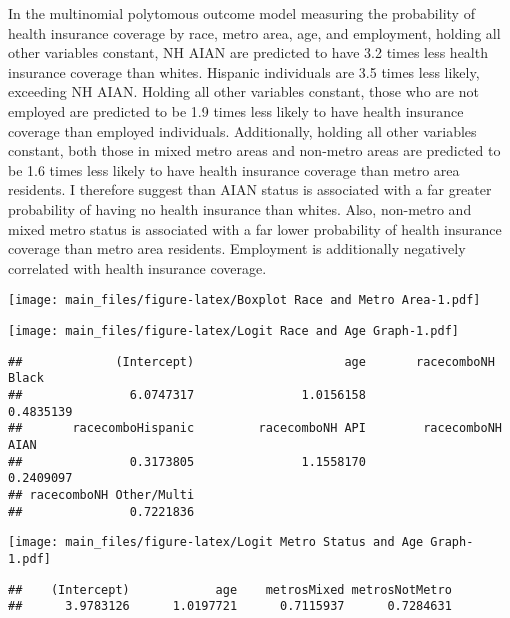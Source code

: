 \documentclass[11pt,]{article}
\makeatletter
\def\maxwidth{\ifdim\Gin@nat@width>\linewidth\linewidth
\else\Gin@nat@width\fi}
\let\Oldincludegraphics\includegraphics
\renewcommand{\includegraphics}[1]{\Oldincludegraphics[width=\maxwidth]{#1}}
\makeatother
\begin{document}
In the multinomial polytomous outcome model measuring the probability of
health insurance coverage by race, metro area, age, and employment,
holding all other variables constant, NH AIAN are predicted to have 3.2
times less health insurance coverage than whites. Hispanic individuals
are 3.5 times less likely, exceeding NH AIAN. Holding all other
variables constant, those who are not employed are predicted to be 1.9
times less likely to have health insurance coverage than employed
individuals. Additionally, holding all other variables constant, both
those in mixed metro areas and non-metro areas are predicted to be 1.6
times less likely to have health insurance coverage than metro area
residents. I therefore suggest than AIAN status is associated with a far
greater probability of having no health insurance than whites. Also,
non-metro and mixed metro status is associated with a far lower
probability of health insurance coverage than metro area residents.
Employment is additionally negatively correlated with health insurance
coverage.

\texttt{[image: main\_files/figure-latex/Boxplot Race and Metro Area-1.pdf]}

\texttt{[image: main\_files/figure-latex/Logit Race and Age Graph-1.pdf]}

\begin{verbatim}
##             (Intercept)                     age       racecomboNH Black 
##               6.0747317               1.0156158               0.4835139 
##       racecomboHispanic         racecomboNH API        racecomboNH AIAN 
##               0.3173805               1.1558170               0.2409097 
## racecomboNH Other/Multi 
##               0.7221836
\end{verbatim}

\texttt{[image: main\_files/figure-latex/Logit Metro Status and Age Graph-1.pdf]}

\begin{verbatim}
##    (Intercept)            age    metrosMixed metrosNotMetro 
##      3.9783126      1.0197721      0.7115937      0.7284631
\end{verbatim}
\end{document}
